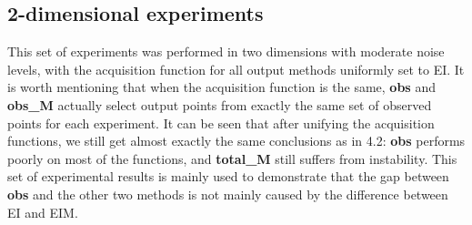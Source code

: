 \documentclass{article}
\begin{document}
\subsection{2-dimensional experiments}
\hspace{2em}This set of experiments was performed in two dimensions with moderate noise levels, with the acquisition function for all output methods uniformly set to EI. It is worth mentioning that when the acquisition function is the same, \textbf{obs} and \textbf{obs\_M} actually select output points from exactly the same set of observed points for each experiment. It can be seen that after unifying the acquisition functions, we still get almost exactly the same conclusions as in 4.2: \textbf{obs} performs poorly on most of the functions, and \textbf{total\_M} still suffers from instability. This set of experimental results is mainly used to demonstrate that the gap between \textbf{obs}  and the other two methods is not mainly caused by the difference between EI and EIM.
\end{document}
